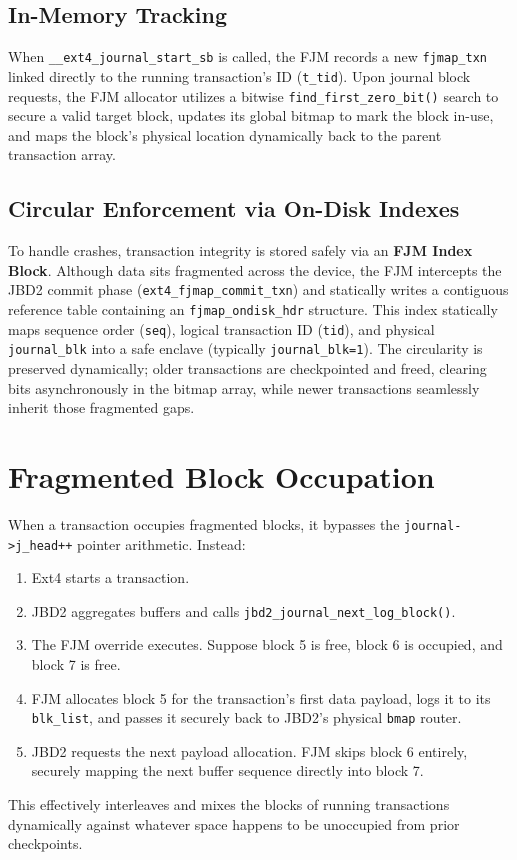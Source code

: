\documentclass{article}
\begin{document}
\subsection{In-Memory Tracking}
When \texttt{\_\_ext4\_journal\_start\_sb} is called, the FJM records a new \texttt{fjmap\_txn} linked directly to the running transaction's ID (\texttt{t\_tid}). Upon journal block requests, the FJM allocator utilizes a bitwise \texttt{find\_first\_zero\_bit()} search to secure a valid target block, updates its global bitmap to mark the block in-use, and maps the block's physical location dynamically back to the parent transaction array. 

\subsection{Circular Enforcement via On-Disk Indexes}
To handle crashes, transaction integrity is stored safely via an \textbf{FJM Index Block}. Although data sits fragmented across the device, the FJM intercepts the JBD2 commit phase (\texttt{ext4\_fjmap\_commit\_txn}) and statically writes a contiguous reference table containing an \texttt{fjmap\_ondisk\_hdr} structure. This index statically maps sequence order (\texttt{seq}), logical transaction ID (\texttt{tid}), and physical \texttt{journal\_blk} into a safe enclave (typically \texttt{journal\_blk=1}). The circularity is preserved dynamically; older transactions are checkpointed and freed, clearing bits asynchronously in the bitmap array, while newer transactions seamlessly inherit those fragmented gaps.

\section{Fragmented Block Occupation}
When a transaction occupies fragmented blocks, it bypasses the \texttt{journal->j\_head++} pointer arithmetic. Instead:
\begin{enumerate}
    \item Ext4 starts a transaction.
    \item JBD2 aggregates buffers and calls \texttt{jbd2\_journal\_next\_log\_block()}.
    \item The FJM override executes. Suppose block 5 is free, block 6 is occupied, and block 7 is free.
    \item FJM allocates block 5 for the transaction's first data payload, logs it to its \texttt{blk\_list}, and passes it securely back to JBD2's physical \texttt{bmap} router.
    \item JBD2 requests the next payload allocation. FJM skips block 6 entirely, securely mapping the next buffer sequence directly into block 7.
\end{enumerate}
This effectively interleaves and mixes the blocks of running transactions dynamically against whatever space happens to be unoccupied from prior checkpoints.
\end{document}
